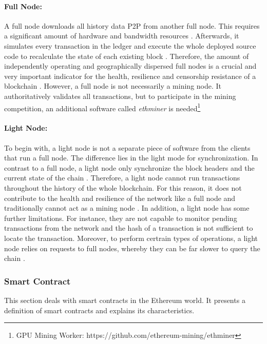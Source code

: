 \paragraph{Full Node:} A full node downloads all history data P2P from
another full node. This requires a significant amount of hardware and bandwidth resources .
Afterwards, it simulates every transaction in the ledger
and execute the whole deployed source code to recalculate the state of each existing block .
Therefore, the amount of independently operating and geographically dispersed full nodes 
is a crucial and very important indicator for the health, resilience and 
censorship resistance of a blockchain . 
However, a full node is not necessarily a mining node. It authoritatively validates all transactions, but 
to participate in the mining competition, an additional software called \textit{ethminer}
 is needed\footnote{GPU Mining Worker: https://github.com/ethereum-mining/ethminer}

\paragraph{Light Node:} To begin with, a light node is not a separate piece of software from the clients that 
run a full node. The difference lies in the light mode for synchronization. 
In contrast to a full node, a light node only synchronize the block headers and the 
current state of the chain .
Therefore, a light node cannot run transactions throughout the history of the 
whole blockchain. For this reason, it does not contribute to the health and resilience of 
the network like a full node and traditionally cannot act as a mining node . 
In addition, a light node has some further limitations. For instance, they are not 
capable to monitor pending transactions from the network and the hash of a transaction
is not sufficient to locate the transaction. Moreover, to perform certrain types of operations,
a light node relies on requests to full nodes, whereby they can be far slower to query the chain .


\subsubsection{Smart Contract}
\label{sec:smart_contract}
This section deals with smart contracts in the Ethereum world. It presents a definition 
of smart contracts and explains its characteristics.

